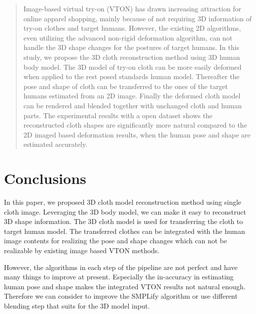 \documentclass[runningheads]{llncs}
\begin{document}
\begin{abstract}

Image-based virtual try-on (VTON) has drawn increasing attraction for online apparel shopping, mainly because of not requiring 3D information of try-on clothes and target humans. However, the existing 2D algorithms, even utilizing the advanced non-rigid deformation algorithm, can not handle the 3D shape changes for the postures of target humans. In this study, we propose the 3D cloth reconstruction method using 3D human body model. The 3D model of try-on cloth can be more easily deformed when applied to the rest posed standards human model. Thereafter the pose and shape of cloth can be transferred to the ones of the target humans estimated from an 2D image. Finally the deformed cloth model can be rendered and blended together with unchanged cloth and human parts. The experimental results with a open dataset shows the reconstructed cloth shapes are significantly more natural compared to the 2D imaged based deformation results, when the human pose and shape are estimated accurately.         

\end{abstract}








\section{Conclusions}

In this paper, we proposed 3D cloth model reconstruction method using single cloth image. Leveraging the 3D body model, we can make it easy to reconstruct 3D shape information. The 3D cloth model is used for transferring the cloth to target human model.  The transferred clothes can be integrated with the human image contents for realizing the pose and shape changes which can not be realizable by existing image based VTON methods.

However, the algorithms in each step of the pipeline are not perfect and have many things to improve at present. Especially the in-accuracy in estimating human pose and shape makes the integrated VTON results not natural enough. Therefore we can consider to improve the SMPLify\cite{Bogo2016SMPLify} algorithm or use different blending step that suits for the 3D model input.
     

  
\clearpage
%
%


\end{document}
